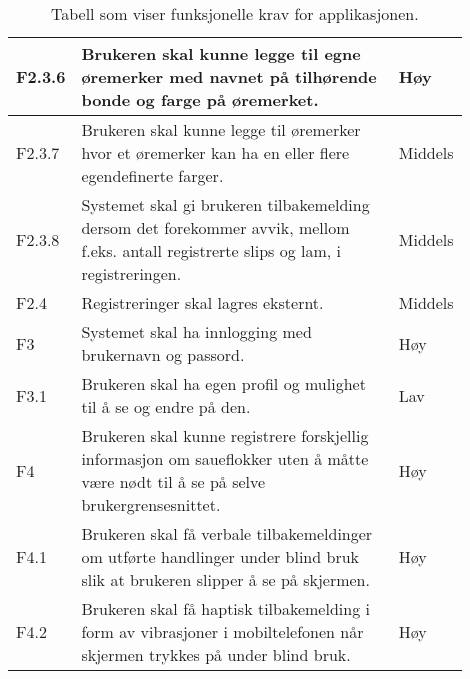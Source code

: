 \begin{table}[H]
\begin{tabular}{| p{0.1\linewidth} | p{0.7\linewidth} | p{0.1\linewidth} |}
        \hline
        F2.3.6 & Brukeren skal kunne legge til egne øremerker med navnet på tilhørende bonde og farge på øremerket. & Høy \\
        \hline
        F2.3.7 & Brukeren skal kunne legge til øremerker hvor et øremerker kan ha en eller flere egendefinerte farger. & Middels \\
        \hline
        F2.3.8 & Systemet skal gi brukeren tilbakemelding dersom det forekommer avvik, mellom f.eks. antall registrerte slips og lam, i registreringen. & Middels \\
        \hline
        F2.4 & Registreringer skal lagres eksternt. & Middels \\
        \hline
        F3 & Systemet skal ha innlogging med brukernavn og passord. & Høy \\
        \hline
        F3.1 & Brukeren skal ha egen profil og mulighet til å se og endre på den. & Lav \\
        \hline
        F4 & Brukeren skal kunne registrere forskjellig informasjon om saueflokker uten å måtte være nødt til å se på selve brukergrensesnittet. & Høy \\
        \hline
        F4.1 & Brukeren skal få verbale tilbakemeldinger om utførte handlinger under blind bruk slik at brukeren slipper å se på skjermen. & Høy \\
        \hline
        F4.2 & Brukeren skal få haptisk tilbakemelding i form av vibrasjoner i mobiltelefonen når skjermen trykkes på under blind bruk. & Høy \\
        \hline
    \end{tabular}
    \caption{Tabell som viser funksjonelle krav for applikasjonen.}
    \label{tbl:funksjonelle-krav}
\end{table}

